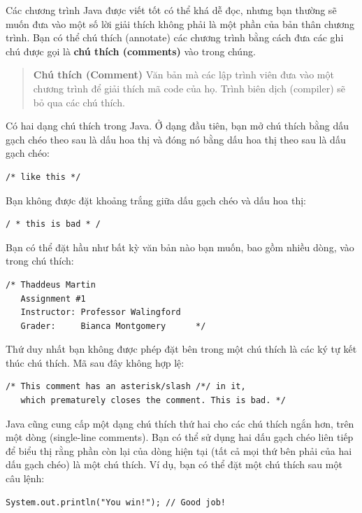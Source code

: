 Các chương trình Java được viết tốt có thể khá dễ đọc, nhưng bạn thường
sẽ muốn đưa vào một số lời giải thích không phải là một phần của bản
thân chương trình. Bạn có thể chú thích (annotate) các chương trình bằng
cách đưa các ghi chú được gọi là \textbf{chú thích (comments)} vào trong
chúng.

\begin{quote}
\textbf{Chú thích (Comment)} Văn bản mà các lập trình viên đưa vào một
chương trình để giải thích mã code của họ. Trình biên dịch (compiler) sẽ
bỏ qua các chú thích.
\end{quote}

Có hai dạng chú thích trong Java. Ở dạng đầu tiên, bạn mở chú thích bằng
dấu gạch chéo theo sau là dấu hoa thị và đóng nó bằng dấu hoa thị theo
sau là dấu gạch chéo:

\begin{verbatim}
/* like this */
\end{verbatim}

Bạn không được đặt khoảng trắng giữa dấu gạch chéo và dấu hoa thị:

\begin{verbatim}
/ * this is bad * /
\end{verbatim}

Bạn có thể đặt hầu như bất kỳ văn bản nào bạn muốn, bao gồm nhiều dòng,
vào trong chú thích:

\begin{verbatim}
/* Thaddeus Martin
   Assignment #1
   Instructor: Professor Walingford
   Grader:     Bianca Montgomery      */
\end{verbatim}

Thứ duy nhất bạn không được phép đặt bên trong một chú thích là các ký
tự kết thúc chú thích. Mã sau đây không hợp lệ:

\begin{verbatim}
/* This comment has an asterisk/slash /*/ in it,
   which prematurely closes the comment. This is bad. */
\end{verbatim}

Java cũng cung cấp một dạng chú thích thứ hai cho các chú thích ngắn
hơn, trên một dòng (single-line comments). Bạn có thể sử dụng hai dấu
gạch chéo liên tiếp để biểu thị rằng phần còn lại của dòng hiện tại (tất
cả mọi thứ bên phải của hai dấu gạch chéo) là một chú thích. Ví dụ, bạn
có thể đặt một chú thích sau một câu lệnh:

\begin{verbatim}
System.out.println("You win!"); // Good job!
\end{verbatim}


